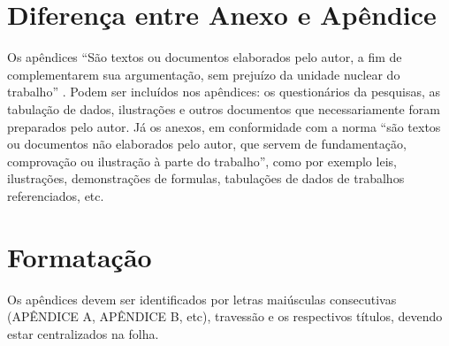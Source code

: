 
\begin{apendicesenv}
\partapendices  %

\chapter{Diferença entre Anexo e Apêndice}


Os apêndices ``São textos ou documentos elaborados pelo autor, a fim de complementarem sua argumentação, sem prejuízo da unidade nuclear do trabalho'' \cite{NBR14724:2011}. Podem ser incluídos nos apêndices:  os questionários da pesquisas, as tabulação de dados, ilustrações e outros documentos que necessariamente foram preparados pelo autor. Já os anexos, em conformidade com a norma \cite{NBR14724:2011}``são textos ou documentos não elaborados pelo autor, que servem de fundamentação, comprovação ou ilustração à parte do trabalho'', como por exemplo leis, ilustrações, demonstrações de formulas, tabulações de dados de trabalhos referenciados, etc.



\chapter{Formatação}

Os apêndices devem ser identificados por letras maiúsculas consecutivas (APÊNDICE A, APÊNDICE B, etc), travessão e os respectivos títulos, devendo estar
centralizados na folha. 

\end{apendicesenv}
